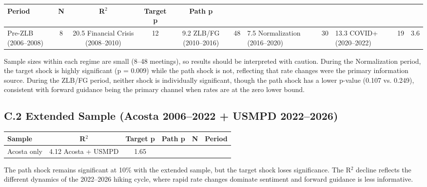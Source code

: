 \documentclass[12pt]{article}
\begin{document}
\begin{table}[htbp]
\centering
\begin{tabular}{lcccc}
\toprule
Period & N & R$^2$ & Target p & Path p \\
\midrule
Pre-ZLB (2006–2008) & 8 & 20.5%
Financial Crisis (2008–2010) & 12 & 9.2%
ZLB/FG (2010–2016) & 48 & 7.5%
Normalization (2016–2020) & 30 & 13.3%
COVID+ (2020–2022) & 19 & 3.6%
\bottomrule
\end{tabular}
\end{table}

Sample sizes within each regime are small (8–48 meetings), so results should be interpreted with caution. During the Normalization period, the target shock is highly significant (p = 0.009) while the path shock is not, reflecting that rate changes were the primary information source. During the ZLB/FG period, neither shock is individually significant, though the path shock has a lower p-value (0.107 vs. 0.249), consistent with forward guidance being the primary channel when rates are at the zero lower bound.

\subsection{C.2 Extended Sample (Acosta 2006–2022 + USMPD 2022–2026)}

\begin{table}[htbp]
\centering
\begin{tabular}{lccccc}
\toprule
Sample & R$^2$ & Target p & Path p & N & Period \\
\midrule
Acosta only & 4.12%
Acosta + USMPD & 1.65%
\bottomrule
\end{tabular}
\end{table}

The path shock remains significant at 10\% with the extended sample, but the target shock loses significance. The R$^2$ decline reflects the different dynamics of the 2022–2026 hiking cycle, where rapid rate changes dominate sentiment and forward guidance is less informative.
\end{document}
